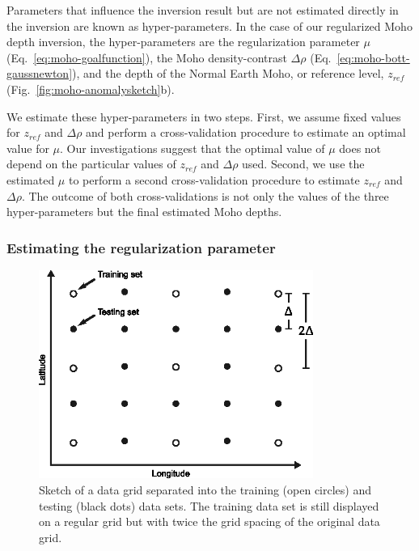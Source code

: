 Parameters that influence the inversion result but are not estimated directly
in the inversion are known as hyper-parameters.
In the case of our regularized Moho depth inversion, the hyper-parameters are
the regularization parameter $\mu$ (Eq.~\ref{eq:moho-goalfunction}),
the Moho density-contrast $\Delta \rho$ (Eq.~\ref{eq:moho-bott-gaussnewton}),
and the depth of the Normal Earth Moho, or reference level, $z_{ref}$
(Fig.~\ref{fig:moho-anomalysketch}b).

We estimate these hyper-parameters in two steps.
First, we assume fixed values for
$z_{ref}$ and $\Delta\rho$ and perform a cross-validation procedure
\citep{hansen1992} to estimate an optimal value for $\mu$.
Our investigations suggest that the optimal value of $\mu$ does not depend on
the particular values of $z_{ref}$ and $\Delta\rho$ used.
Second, we use the estimated $\mu$ to perform a second cross-validation
procedure to estimate $z_{ref}$ and $\Delta\rho$.
The outcome of both cross-validations is not only the values of the three
hyper-parameters but the final estimated Moho depths.



\subsubsection{Estimating the regularization parameter}

\begin{figure}
    \centering
    \includegraphics[width=0.8\textwidth]{figures/paper-moho/cv-grid-separation}
    \caption{Sketch of a data grid separated into
        the training (open circles)
        and testing (black dots) data sets.
        The training data set is still displayed on a regular grid
        but with twice the grid spacing
        of the original data grid.}
    \label{fig:moho-grid_separation}
\end{figure}

